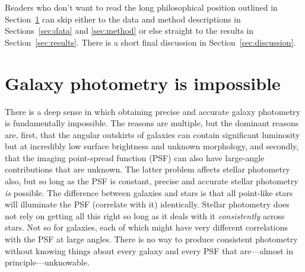 \documentclass[12pt,preprint,pdftex]{aastex}
\newcommand{\sectionname}{Section}
\newcommand{\sectionnames}{\sectionname s}
\begin{document}
Readers who don't want to read the long philosophical position
outlined in \sectionname~\ref{sec:philosophy} can skip either to the
data and method descriptions in \sectionnames~\ref{sec:data} and
\ref{sec:method} or else straight to the results in
\sectionname~\ref{sec:results}.  There is a short final discussion in
\sectionname~\ref{sec:discussion}.

\section{Galaxy photometry is impossible}\label{sec:philosophy}

There is a deep sense in which obtaining precise and accurate galaxy
photometry is fundamentally impossible.  The reasons are multiple, but
the dominant reasons are, first, that the angular outskirts of
galaxies can contain significant luminosity but at incredibly low
surface brightness and unknown morphology, and secondly, that the
imaging point-spread function (PSF) can also have large-angle
contributions that are unknown.  The latter problem affects stellar
photometry also, but so long as the PSF is constant, precise and
accurate stellar photometry \emph{is} possible.  The difference
between galaxies and stars is that all point-like stars will
illuminate the PSF (correlate with it) identically.  Stellar
photometry does not rely on getting all this right so long as it deals
with it \emph{consistently} across stars.  Not so for galaxies, each
of which might have very different correlations with the PSF at large
angles.  There is no way to produce consistent photometry without
knowing things about every galaxy and every PSF that are---almost in
principle---unknowable.
\end{document}
